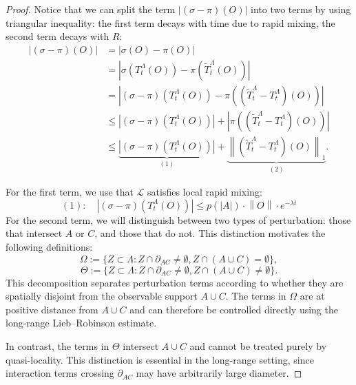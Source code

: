 \documentclass[11pt]{article}
\numberwithin{equation}{section}
\numberwithin{figure}{section}
\numberwithin{table}{section}
\theoremstyle{definition}
\theoremstyle{plain}
\theoremstyle{remark}
\newcommand{\Li}{\mathcal{L}}
\newcommand{\T}{T^\Lambda}
\newcommand{\TT}{\widetilde{T}^\Lambda}
\newcommand{\norm}[1]{\left\lVert#1\right\rVert}
\newcommand{\normm}[2]{\left\lVert#1\right\rVert_{#2}}
\newcommand{\abs}[1]{\left \vert#1\right\vert}
\begin{document}
\begin{proof}
    Notice that we can split the term $\abs{(\sigma-\pi)(O)}$ into two terms by using triangular inequality: the first term decays with time due to rapid mixing, the second term decays with $R$:
  \begin{align}
\abs{(\sigma-\pi)(O)} &= \abs{\sigma(O)-\pi(O)} \label{eq:diferenceStates} \\
&= \abs{\sigma(\T_t(O))-\pi(\TT_t(O))} \nonumber\\
&= \abs{(\sigma-\pi)(\T_t(O))-\pi((\TT_t-\T_t)(O))} \nonumber\\
&\le \abs{(\sigma-\pi)(\T_t(O))}+\abs{\pi((\TT_t-\T_t)(O))} \nonumber\\
&\le \underbrace{\abs{(\sigma-\pi)(\T_t(O))}}_{(1)}+\underbrace{\normm{(\TT_t-\T_t)(O)}{1}}_{(2)}. \nonumber
\end{align}


    For the first term, we use that $\Li$ satisfies local rapid mixing:
     \begin{equation*}
        (1):\quad \abs{(\sigma-\pi)(\T_t(O))} \leq p(\abs{A})\cdot   \norm{O} \cdot e^{-\lambda t}
     \end{equation*}
     For the second term, we will distinguish between two types of perturbation: those that intersect $A$ or $C$, and those that do not. This distinction motivates the following definitions:
     \begin{equation}
         \Omega:=\{ Z\subset \Lambda : Z\cap \partial_{AC}\neq \emptyset,Z\cap(A\cup C)= \emptyset\},
         \label{eq:Omega}
     \end{equation}
     \begin{equation}
         \Theta := \{ Z\subset \Lambda : Z\cap \partial_{AC}\neq \emptyset,Z\cap(A\cup C)\neq \emptyset\}.
         \label{eq:Theta}
     \end{equation}
     This decomposition separates perturbation terms according to whether
    they are spatially disjoint from the observable support $A\cup C$.
    The terms in $\Omega$ are at positive distance from $A\cup C$ and can
    therefore be controlled directly using the long-range Lieb–Robinson
    estimate. 
    
    In contrast, the terms in $\Theta$ intersect $A\cup C$ and cannot be
    treated purely by quasi-locality. This distinction is essential in the
    long-range setting, since interaction terms crossing $\partial_{AC}$
    may have arbitrarily large diameter.
    

\end{proof}
\end{document}
